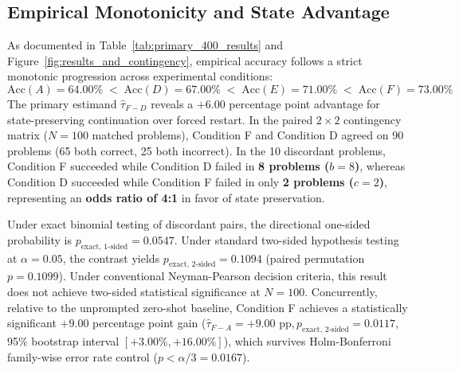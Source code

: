 \documentclass[11pt]{article}
\begin{document}
\subsection{Empirical Monotonicity and State Advantage}
As documented in Table~\ref{tab:primary_400_results} and Figure~\ref{fig:results_and_contingency}, empirical accuracy follows a strict monotonic progression across experimental conditions:
\begin{equation}
\text{Acc}(A) = 64.00\% \;<\; \text{Acc}(D) = 67.00\% \;<\; \text{Acc}(E) = 71.00\% \;<\; \text{Acc}(F) = 73.00\%
\end{equation}
The primary estimand $\hat{\tau}_{F-D}$ reveals a $+6.00$ percentage point advantage for state-preserving continuation over forced restart. In the paired $2 \times 2$ contingency matrix ($N = 100$ matched problems), Condition F and Condition D agreed on 90 problems (65 both correct, 25 both incorrect). In the 10 discordant problems, Condition F succeeded while Condition D failed in \textbf{8 problems ($b = 8$)}, whereas Condition D succeeded while Condition F failed in only \textbf{2 problems ($c = 2$)}, representing an \textbf{odds ratio of 4:1} in favor of state preservation.

Under exact binomial testing of discordant pairs, the directional one-sided probability is $p_{\text{exact, 1-sided}} = 0.0547$. Under standard two-sided hypothesis testing at $\alpha = 0.05$, the contrast yields $p_{\text{exact, 2-sided}} = 0.1094$ (paired permutation $p = 0.1099$). Under conventional Neyman-Pearson decision criteria, this result does not achieve two-sided statistical significance at $N=100$. Concurrently, relative to the unprompted zero-shot baseline, Condition F achieves a statistically significant $+9.00$ percentage point gain ($\hat{\tau}_{F-A} = +9.00\text{ pp}, p_{\text{exact, 2-sided}} = 0.0117$, 95\% bootstrap interval $[+3.00\%, +16.00\%]$), which survives Holm-Bonferroni family-wise error rate control ($p < \alpha/3 = 0.0167$).
\end{document}
